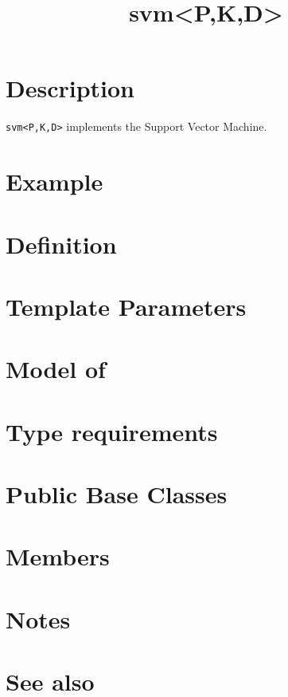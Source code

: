 \documentclass{article}
\begin{document}
\title{svm<P,K,D>}
\maketitle

\section*{Description}

\texttt{svm<P,K,D>} implements the Support Vector Machine. 

\section*{Example}
\section*{Definition}
\section*{Template Parameters}
\section*{Model of}
\section*{Type requirements}
\section*{Public Base Classes}
\section*{Members}
\section*{Notes}
\section*{See also}



\end{document}
